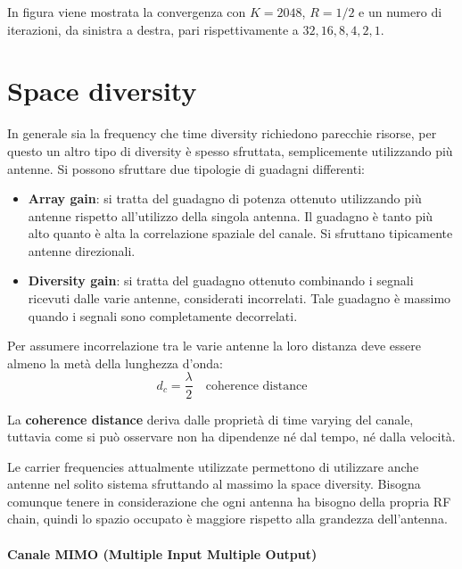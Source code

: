 In figura viene mostrata la convergenza con $K=2048$, $R=1/2$ e un numero di iterazioni, da sinistra a destra, pari rispettivamente a $32, 16, 8, 4, 2, 1$.


\section*{Space diversity}

In generale sia la frequency che time diversity richiedono parecchie risorse, per questo un altro tipo di diversity è spesso sfruttata, semplicemente utilizzando più antenne. Si possono sfruttare due tipologie di guadagni differenti:
\begin{itemize}
    \item \textbf{Array gain}: si tratta del guadagno di potenza ottenuto utilizzando più antenne rispetto all'utilizzo della singola antenna. Il guadagno è tanto più alto quanto è alta la correlazione spaziale del canale. Si sfruttano tipicamente antenne direzionali.
    \item \textbf{Diversity gain}: si tratta del guadagno ottenuto combinando i segnali ricevuti dalle varie antenne, considerati incorrelati. Tale guadagno è massimo quando i segnali sono completamente decorrelati. 
\end{itemize} 

Per assumere incorrelazione tra le varie antenne la loro distanza deve essere almeno la metà della lunghezza d'onda:
\[
    d_c = \frac{\lambda}{2} \quad \text{coherence distance}
\]  

La \textbf{coherence distance} deriva dalle proprietà di time varying del canale, tuttavia come si può osservare non ha dipendenze né dal tempo, né dalla velocità.

Le carrier frequencies attualmente utilizzate permettono di utilizzare anche antenne nel solito sistema sfruttando al massimo la space diversity. Bisogna comunque tenere in considerazione che ogni antenna ha bisogno della propria RF chain, quindi lo spazio occupato è maggiore rispetto alla grandezza dell'antenna.


\paragraph*{Canale MIMO (Multiple Input Multiple Output)}


